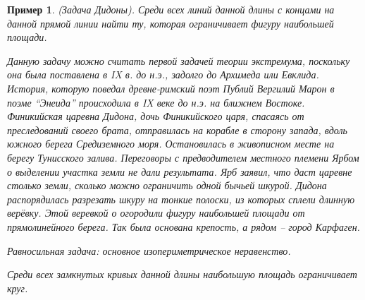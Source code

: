 \documentclass[12pt,a4paper]{article}
\newtheorem{ex}{Пример}
\begin{document}
\begin{ex}\label{ex.Dido}
{\em (Задача Дидоны). } Среди всех линий данной длины с концами на
данной прямой линии найти ту, которая ограничивает фигуру
наибольшей площади.

{\em Данную задачу можно считать первой задачей теории экстремума,
поскольку она была поставлена в IX в. до н.э., задолго до Архимеда
или Евклида.   История, которую поведал древне-римский поэт Публий
Вергилий Марон в поэме ``Энеида'' происходила в IX веке до н.э. на
ближнем Востоке. Финикийская царевна Дидона, дочь Финикийского
царя, спасаясь от преследований  своего брата, отправилась на
корабле в сторону  запада, вдоль южного берега Средиземного моря.
Остановилась в живописном месте на берегу Тунисского залива.
Переговоры с предводителем местного племени Ярбом о выделении
участка земли не дали результата. Ярб заявил, что даст царевне
столько земли, сколько можно ограничить одной бычьей шкурой.
Дидона распорядилась разрезать шкуру на тонкие полоски, из которых
сплели длинную верёвку. Этой веревкой о огородили фигуру
наибольшей площади от прямолинейного берега. Так была основана
крепость, а рядом -- город Карфаген.

Равносильная задача: основное изопериметрическое неравенство.  }
Среди всех замкнутых кривых данной длины наибольшую площадь
ограничивает круг.


\end{ex}
\end{document}
